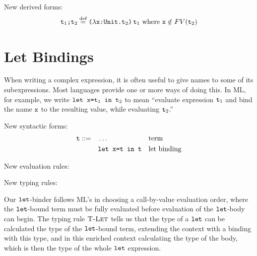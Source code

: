 \documentclass[11pt,twoside=off,numbers=noenddot]{scrbook}
\begin{document}
New derived forms:
\begin{align*}
  \ttt{$\ttt{t}_1$;$\ttt{t}_2$} \overset{\text{def}}{=}
  \ttt{($\lambda$x:Unit.$\ttt{t}_2$)\,$\ttt{t}_1$} \text{ where
  $\ttt{x} \notin FV(\ttt{t}_2)$}
\end{align*}

\section{Let Bindings}
When writing a complex expression, it is often useful to give names
to some of its subexpressions. Most languages provide one or more
ways of doing this. In ML, for example, we write $\ttt{let
x=$\ttt{t}_1$ in $\ttt{t}_2$}$ to mean ``evaluate expression
$\ttt{t}_1$ and bind the name $\ttt{x}$ to the resulting value, while
evaluating $\ttt{t}_2$.''

New syntactic forms:
\begin{align*}
  \ttt{t} ::= & \quad \dots && \text{term} \\
  & \quad \ttt{let x=t in t} && \text{let binding}
\end{align*}

New evaluation rules:
\begin{prooftree}
\end{prooftree}

\begin{prooftree}
\end{prooftree}

New typing rules:
\begin{prooftree}
\end{prooftree}

Our $\ttt{let}$-binder follows ML's in choosing a call-by-value
evaluation order, where the $\ttt{let}$-bound term must be fully
evaluated before evaluation of the $\ttt{let}$-body can begin. The
typing rule $\tsc{T-Let}$ tells us that the type of a $\ttt{let}$ can
be calculated the type of the $\ttt{let}$-bound term, extending the
context with a binding with this type, and in this enriched context
calculating the type of the body, which is then the type of the whole
$\ttt{let}$ expression.
\end{document}

